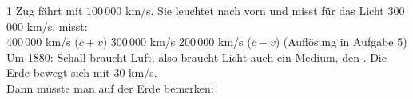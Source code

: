 \documentclass[11pt,a4paper]{article}
\begin{document}

\begin{aufgabe}{1}
 Zug fährt mit $100\,000$ km/s. Sie leuchtet nach vorn und misst für das Licht 300\,000 km/s.  misst:\\[0.5mm]
 400\,000 km/s ($c + v$) \quad {} 300\,000 km/s \quad {} 200\,000 km/s ($c - v$) \hfill {\small (Auflösung in Aufgabe 5)}\\[1mm]
\lueckentext
Um 1880: Schall braucht Luft, also braucht Licht auch ein Medium, den . Die Erde bewegt sich mit 30 km/s.\\
Dann müsste man auf der Erde bemerken:\\ 
\end{aufgabe}
\end{document}

